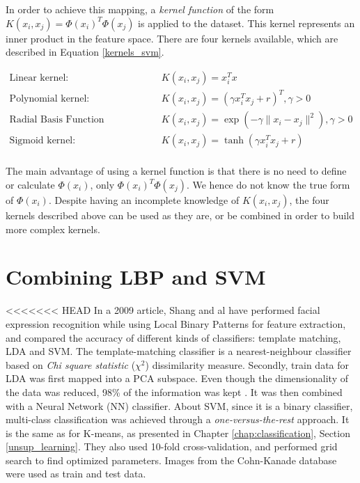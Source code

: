 \noindent In order to achieve this mapping, a \textit{kernel function} of the form $K(x_i, x_j) = \Phi(x_i)^T \Phi(x_j)$ is applied to the dataset. This kernel represents an inner product in the feature space. There are four kernels available, which are described in Equation \ref{kernels_svm}.
\newline

\begin{equation}
\begin{array}{ll}
	\text{Linear kernel:} & K(x_i,x_j) = x_i^Tx \\
	\text{Polynomial kernel:} & K(x_i,x_j) = (\gamma x_i^Tx_j + r)^T, \gamma > 0 \\
	\text{Radial Basis Function (Gaussian) kernel:} & K(x_i,x_j) = \exp(-\gamma \| x_i - x_j \|^2), \gamma > 0 \\
	\text{Sigmoid kernel:} & K(x_i,x_j) = \tanh(\gamma x_i^T x_j + r)\\
\end{array}
\label{kernels_svm}
\end{equation}

\vspace{\baselineskip}

\noindent The main advantage of using a kernel function is that there is no need to define or calculate $\Phi(x_i)$, only $\Phi(x_i)^T \Phi(x_j)$. We hence do not know the true form of $\Phi(x_i)$. Despite having an incomplete knowledge of $K(x_i,x_j)$, the four kernels described above can be used as they are, or be combined in order to build more complex kernels.
\newline

\section{Combining LBP and SVM}

\vspace{\baselineskip}
<<<<<<< HEAD
\noindent In a 2009 article, Shang and al \cite{SHA09} have performed facial expression recognition while using Local Binary Patterns for feature extraction, and compared the accuracy of different kinds of classifiers:  template matching,  LDA and SVM. The template-matching classifier is a nearest-neighbour classifier based on \textit{Chi square statistic} ($\chi^2$) dissimilarity measure. Secondly, train data for LDA was first mapped into a PCA subspace. Even though the dimensionality of the data was reduced, 98\% of the information was kept \cite{SHA09}. It was then combined with a Neural Network (NN) classifier. About SVM, since it is a binary classifier, multi-class classification was achieved through a \textit{one-versus-the-rest} approach. It is the same as for K-means, as presented in Chapter \ref{chap:classification}, Section \ref{unsup_learning}. They also used 10-fold cross-validation, and performed grid search to find optimized parameters. Images from the Cohn-Kanade database were used as train and test data.
\newline

